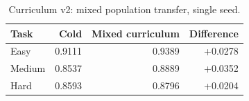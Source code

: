 \begin{table}[h]
\centering
\caption{Curriculum v2: mixed population transfer, single seed.}
\begin{tabular}{l r r r}
\hline
Task & Cold & Mixed curriculum & Difference \\
\hline
Easy & 0.9111 & 0.9389 & +0.0278 \\
Medium & 0.8537 & 0.8889 & +0.0352 \\
Hard & 0.8593 & 0.8796 & +0.0204 \\
\hline
\end{tabular}
\end{table}
